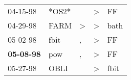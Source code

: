 \begin{supertabular}{p{0.07\textwidth}p{0.06\textwidth}p{0.02\textwidth}p{0.02\textwidth}p{0.06\textwidth}}
          04-15-98\textsuperscript{} &                   *OS2* &               &  \textgreater &    FF\textsuperscript{} \\
          04-29-98\textsuperscript{} &  FARM\textsuperscript{} &  \textgreater &  \textgreater &  bath\textsuperscript{} \\
          05-02-98\textsuperscript{} &  fbit\textsuperscript{} &             , &  \textgreater &    FF\textsuperscript{} \\
 \textbf{05-08-98\textsuperscript{}} &   pow\textsuperscript{} &             , &  \textgreater &    FF\textsuperscript{} \\
          05-27-98\textsuperscript{} &  OBLI\textsuperscript{} &               &  \textgreater &  fbit\textsuperscript{} \\
\end{supertabular}
